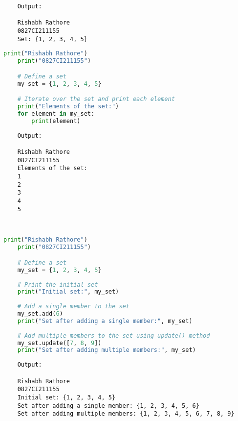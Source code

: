 \documentclass{report}
\begin{document}
\begin{verbatim}
	Output:

	Rishabh Rathore
	0827CI211155
	Set: {1, 2, 3, 4, 5}

\end{verbatim}


\newpage


\sol 
\begin{lstlisting}[language=Python]
	print("Rishabh Rathore")
	print("0827CI211155")

	# Define a set
	my_set = {1, 2, 3, 4, 5}

	# Iterate over the set and print each element
	print("Elements of the set:")
	for element in my_set:
		print(element)
\end{lstlisting}

\begin{verbatim}
	Output:

	Rishabh Rathore
	0827CI211155
	Elements of the set:
	1
	2
	3
	4
	5
	
	
\end{verbatim}


\newpage


\sol 
\begin{lstlisting}[language=Python]
	print("Rishabh Rathore")
	print("0827CI211155")

	# Define a set
	my_set = {1, 2, 3, 4, 5}
	
	# Print the initial set
	print("Initial set:", my_set)
	
	# Add a single member to the set
	my_set.add(6)
	print("Set after adding a single member:", my_set)
	
	# Add multiple members to the set using update() method
	my_set.update([7, 8, 9])
	print("Set after adding multiple members:", my_set)
\end{lstlisting}

\begin{verbatim}
	Output:

	Rishabh Rathore
	0827CI211155
	Initial set: {1, 2, 3, 4, 5}
	Set after adding a single member: {1, 2, 3, 4, 5, 6}
	Set after adding multiple members: {1, 2, 3, 4, 5, 6, 7, 8, 9}

	

\end{verbatim}


\newpage
\end{document}
